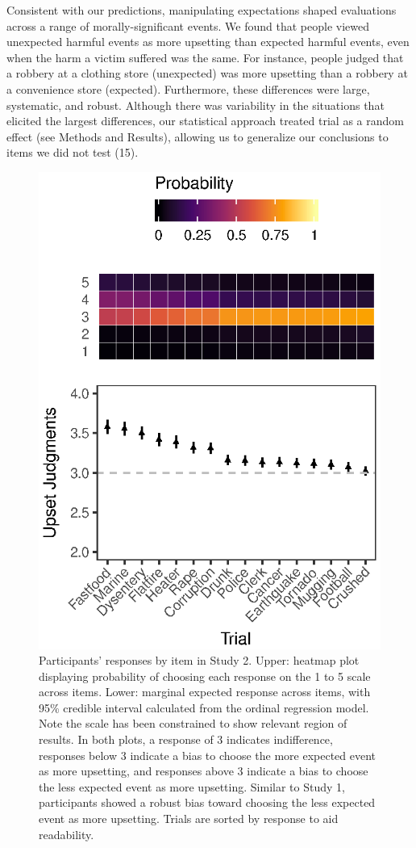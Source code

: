 \documentclass[9pt,twocolumn,twoside,]{pnas-new}
\begin{document}
Consistent with our predictions, manipulating expectations shaped
evaluations across a range of morally-significant events. We found that
people viewed unexpected harmful events as more upsetting than expected
harmful events, even when the harm a victim suffered was the same. For
instance, people judged that a robbery at a clothing store (unexpected)
was more upsetting than a robbery at a convenience store (expected).
Furthermore, these differences were large, systematic, and robust.
Although there was variability in the situations that elicited the
largest differences, our statistical approach treated trial as a random
effect (see Methods and Results), allowing us to generalize our
conclusions to items we did not test (15).

\begin{figure}
\centering
\includegraphics{fig2.eps}
\caption{Participants' responses by item in Study 2. Upper: heatmap plot
displaying probability of choosing each response on the 1 to 5 scale
across items. Lower: marginal expected response across items, with 95\%
credible interval calculated from the ordinal regression model. Note the
scale has been constrained to show relevant region of results. In both
plots, a response of 3 indicates indifference, responses below 3
indicate a bias to choose the more expected event as more upsetting, and
responses above 3 indicate a bias to choose the less expected event as
more upsetting. Similar to Study 1, participants showed a robust bias
toward choosing the less expected event as more upsetting. Trials are
sorted by response to aid readability. {}}
\end{figure}
\end{document}
